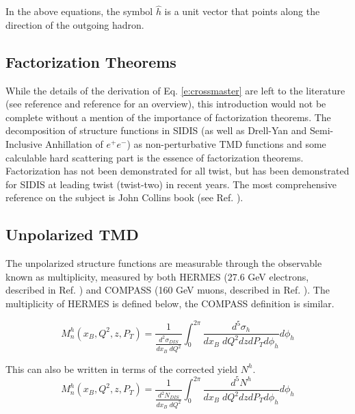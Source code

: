 In the above equations, the symbol $\hat{h}$ is a unit vector that points along the direction of the outgoing hadron. 

\subsection{Factorization Theorems}
While the details of the derivation of Eq. \ref{e:crossmaster} are left to the literature (see reference \cite{tmds-mulders:1995} and reference \cite{tmds-bacchetta:2006} for an overview), this introduction would not be complete without a mention of the importance of factorization theorems.  The decomposition of structure functions in SIDIS (as well as Drell-Yan and Semi-Inclusive Anhillation of $e^+e^-$) as non-perturbative TMD functions and some calculable hard scattering part is the essence of factorization theorems.  Factorization has not been demonstrated for all twist, but has been demonstrated for SIDIS at leading twist (twist-two) in recent years.  The most comprehensive reference on the subject is John Collins book (see Ref. \cite{tmds-collins:2011}). 

\subsection{Unpolarized TMD}
The unpolarized structure functions are measurable through the observable known as multiplicity, measured by both HERMES (27.6 GeV electrons, described in Ref. \cite{tmds-airapetian:2012}) and COMPASS (160 GeV muons, described in Ref. \cite{tmds-aghasyan:2017}).  The multiplicity of HERMES is defined below, the COMPASS definition is similar.

\begin{equation} \label{eqn:sidis-multiplicities}
	M^{h}_{n} (x_B, Q^2, z, P_T) = \frac{1}{\frac{d^2\sigma_{DIS}}{dx_B \; dQ^2}} \int_{0}^{2\pi}  \frac{d^5\sigma_{h}}{dx_B \; dQ^2 dz dP_T d\phi_h} d\phi_h
\end{equation} 

This can also be written in terms of the corrected yield $N^h$.  
\begin{equation} 
	M^{h}_{n} (x_B, Q^2, z, P_T) = \frac{1}{\frac{d^2N_{DIS}}{dx_B \; dQ^2}} \int_{0}^{2\pi}  \frac{d^5N^h}{dx_B \; dQ^2 dz dP_T d\phi_h} d\phi_h
\end{equation} 

